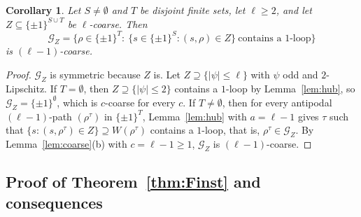 \documentclass[11pt,letterpaper]{article}
\newtheorem{corollary}[theorem]{Corollary}
\theoremstyle{definition}
\newcommand{\cG}{\mathcal{G}}
\newcommand{\cube}[1]{\{\pm1\}^{#1}}
\begin{document}
\begin{corollary}\label{cor:hub}
Let $S\ne\emptyset$ and $T$ be disjoint finite sets, let $\ell\ge2$, and let
$Z\subseteq\cube{S\cup T}$ be $\ell$-coarse. Then
\[
  \cG_Z=\bigl\{\rho\in\cube T:\ \{s\in\cube S:(s,\rho)\in Z\}\ \text{contains a $1$-loop}\bigr\}
\]
is $(\ell-1)$-coarse.
\end{corollary}

\begin{proof}
$\cG_Z$ is symmetric because $Z$ is. Let $Z\supseteq\{|\psi|\le\ell\}$ with $\psi$ odd and
$2$-Lipschitz. If $T=\emptyset$, then $Z\supseteq\{|\psi|\le2\}$ contains a $1$-loop by
Lemma~\ref{lem:hub}, so $\cG_Z=\cube\emptyset$, which is $c$-coarse for every $c$. If
$T\ne\emptyset$, then for every antipodal $(\ell-1)$-path $(\rho^\tau)$ in $\cube T$,
Lemma~\ref{lem:hub} with $a=\ell-1$ gives $\tau$ such that $\{s:(s,\rho^\tau)\in Z\}\supseteq
W(\rho^\tau)$ contains a $1$-loop, that is, $\rho^\tau\in\cG_Z$. By Lemma~\ref{lem:coarse}(b) with
$c=\ell-1\ge1$, $\cG_Z$ is $(\ell-1)$-coarse.
\end{proof}

\subsection{Proof of Theorem~\ref{thm:Finst} and consequences}
\end{document}
